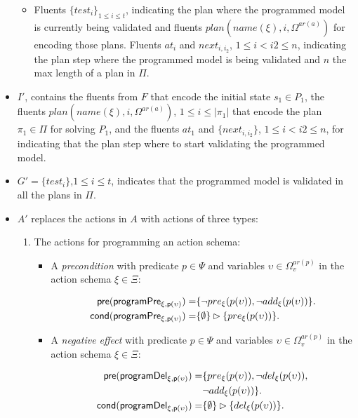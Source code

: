 \documentclass[letterpaper]{article} %
\newcommand{\pre}{\mathsf{pre}}     %
\newcommand{\cond}{\mathsf{cond}}   %
\begin{document}
\begin{itemize}
\begin{itemize}
\item Fluents $\{test_i\}_{1\leq i\leq t}$, indicating the plan where the programmed model is currently being validated and fluents $plan(name(\xi),i,\Omega^{ar(a)})$ for encoding those plans. Fluents $at_i$ and $next_{i,i_2}$, {\small $1\leq i<i2\leq n$}, indicating the plan step where the programmed model is being validated and $n$ the max length of a plan in $\Pi$.
\end{itemize}
\item $I'$, contains the fluents from $F$ that encode the initial state $s_1\in P_1$, the fluents $plan(name(\xi),i,\Omega^{ar(a)})$, {\small $1\leq i\leq |\pi_1|$} that encode the plan $\pi_1\in \Pi$ for solving $P_1$, and the fluents $at_1$ and $\{next_{i,i_2}\}$, {\small $1\leq i<i2\leq n$}, for indicating that the plan step where to start validating the programmed model.
\item $G'=\{test_i\}$,{\small $1\leq i\leq t$}, indicates that the programmed model is validated in all the plans in $\Pi$.
\item $A'$ replaces the actions in $A$ with actions of three types:
\begin{enumerate}
\item The actions for programming an action schema:
\begin{itemize}
\item A {\em precondition} with predicate $p\in\Psi$ and variables $\upsilon\in\Omega_v^{ar(p)}$ in the action schema $\xi\in\Xi$:
\begin{small}
\begin{align*}
\hspace*{7pt}\pre(\mathsf{programPre_{\xi,p(\upsilon)}})=&\{\neg pre_{\xi}(p(\upsilon)),\neg add_{\xi}(p(\upsilon))\}.\\
\cond(\mathsf{programPre_{\xi,p(\upsilon)}})=&\{\emptyset\}\rhd\{pre_{\xi}(p(\upsilon))\}.
\end{align*}
\end{small}
\item A {\em negative effect} with predicate $p\in\Psi$ and variables $\upsilon\in\Omega_v^{ar(p)}$ in the action schema $\xi\in\Xi$:
\begin{small}
\begin{align*}
\hspace*{7pt}\pre(\mathsf{programDel_{\xi,p(\upsilon)}})=&\{pre_{\xi}(p(\upsilon)),\neg del_{\xi}(p(\upsilon)),\\
                                                     &\neg add_{\xi}(p(\upsilon))\}.\\                                                   
\cond(\mathsf{programDel_{\xi,p(\upsilon)}})=&\{\emptyset\}\rhd\{del_{\xi}(p(\upsilon))\}.
\end{align*}
\end{small}


\end{itemize}
\end{enumerate}
\end{itemize}
\end{document}
